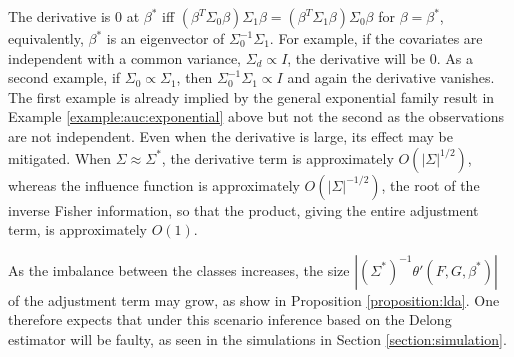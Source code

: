 \documentclass[12pt]{article}
\DeclareMathOperator*{\diag}{diag}
\renewcommand{\t}[1]{{#1}^T}
\renewcommand{\star}[1]{{#1}^\ast}
\newcommand{\F}{F}
\newcommand{\G}{G}
\newcommand{\auc}{\theta}
\theoremstyle{definition}
\begin{document}
  The derivative is $0$ at $\star\beta$ iff
  $(\t\beta\Sigma_0\beta)\Sigma_1\beta=(\t\beta\Sigma_1\beta)\Sigma_0\beta$
  for $\beta=\star\beta$, equivalently, $\star\beta$ is an eigenvector
  of $\Sigma_0^{-1}\Sigma_1$. For example, if the
  covariates are independent with a common variance, $\Sigma_d\propto I$, the derivative will be 0. As a second example, if $\Sigma_0\propto\Sigma_1$, then $\Sigma_0^{-1}\Sigma_1\propto I$ and again the derivative vanishes. %
  The first example is already implied by the general exponential
  family result in Example \ref{example:auc:exponential} above but not the second as the
  observations are not independent.
  Even when the derivative is large, its effect may be mitigated. When
  $\Sigma\approx\star\Sigma$, the derivative term is approximately
  $O(|\Sigma|^{1/2})$, whereas the influence function is approximately
  $O(|\Sigma|^{-1/2})$, the root of the inverse Fisher information, so
  that the product, giving the entire adjustment term, is
  approximately $O(1)$.

  As the imbalance between the classes increases, the size
  $|(\star{\Sigma})^{-1} \auc'(\F,\G,\star{\beta})|$ of the adjustment
  term may grow, as show in Proposition \ref{proposition:lda}.
  One therefore expects that under this scenario inference based on the Delong estimator will be faulty, as seen in the simulations in Section \ref{section:simulation}. %
  
\end{document}

